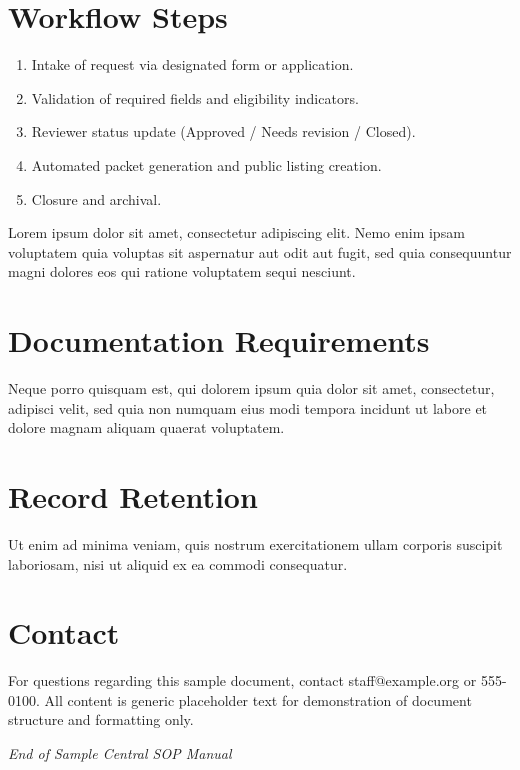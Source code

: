 \documentclass[11pt,a4paper,oneside]{article}
\begin{document}
\section{Workflow Steps}
\begin{enumerate}
  \item Intake of request via designated form or application.
  \item Validation of required fields and eligibility indicators.
  \item Reviewer status update (Approved / Needs revision / Closed).
  \item Automated packet generation and public listing creation.
  \item Closure and archival.
\end{enumerate}

Lorem ipsum dolor sit amet, consectetur adipiscing elit. Nemo enim ipsam voluptatem quia voluptas sit aspernatur aut odit aut fugit, sed quia consequuntur magni dolores eos qui ratione voluptatem sequi nesciunt.

\section{Documentation Requirements}
Neque porro quisquam est, qui dolorem ipsum quia dolor sit amet, consectetur, adipisci velit, sed quia non numquam eius modi tempora incidunt ut labore et dolore magnam aliquam quaerat voluptatem.

\section{Record Retention}
Ut enim ad minima veniam, quis nostrum exercitationem ullam corporis suscipit laboriosam, nisi ut aliquid ex ea commodi consequatur.

\section{Contact}
For questions regarding this sample document, contact staff@example.org or 555-0100. All content is generic placeholder text for demonstration of document structure and formatting only.

\vspace{1cm}
\noindent\hrulefill
\noindent\textit{End of Sample Central SOP Manual}
\end{document}
